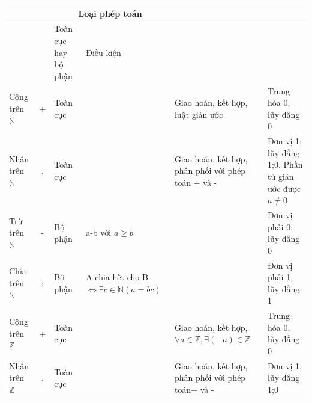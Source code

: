 \documentclass[12pt,oneside,a4paper,reqno]{book}
\begin{document}
\begin{tabular}{|p{1.8cm}|c|p{2cm}|p{3cm}|p{3cm}|p{3cm}|}
\hline 
 &  & \multicolumn{2}{c|}{Loại phép toán} &  &  \\ 
\hline 
 &  & Toàn cục hay bộ phận & Điều kiện &  &  \\ 
\hline 
Cộng trên $\mathbb{N}$ & + & Toàn cục &  & Giao hoán, kết hợp, luật giản ước & Trung hòa 0, lũy đẳng 0 \\ 
\hline 
Nhân trên $\mathbb{N}$ & . & Toàn cục &  & Giao hoán, kết hợp, phân phối với phép toán + và - &Đơn vị 1; lũy đẳng 1;0. Phần tử giản ước được $a\neq 0$   \\ 
\hline 
Trừ trên $\mathbb{N}$ & - & Bộ phận & a-b với $a\ge b$ &  &Đơn vị phải 0, lũy đẳng 0 \\ 
\hline 
Chia trên $\mathbb{N}$& : & Bộ phận & A chia hết cho B $\Leftrightarrow \exists c \in \mathbb{N} (a=bc)$ &  & Đơn vị phải 1, lũy đẳng 1 \\ 
\hline 
Cộng trên $\mathbb{Z}$& +& Toàn cục &  & Giao hoán, kết hợp, $\forall a\in \mathbb{Z},\exists (-a) \in \mathbb{Z}$ & Trung hòa 0, lũy đẳng 0  \\ 
\hline 
Nhân trên $\mathbb{Z}$ & . & Toàn cục &  & Giao hoán, kết hợp, phân phối với phép  toán+ và - & Đơn vị 1, lũy đẳng 1;0 \\ 
\hline 
\end{tabular} 
\end{document}
